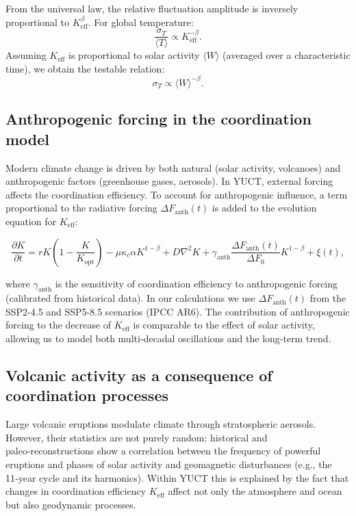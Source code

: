 \documentclass[12pt,a4paper]{article}
\newcommand{\Keff}{K_{\mathrm{eff}}}
\newcommand{\be}{\beta}
\begin{document}
	From the universal law, the relative fluctuation amplitude is inversely proportional to \(\Keff^{\be}\). For global temperature:
	\[
	\frac{\sigma_T}{\langle T \rangle} \propto \Keff^{-\be}.
	\]
	Assuming \(\Keff\) is proportional to solar activity \(\langle W \rangle\) (averaged over a characteristic time), we obtain the testable relation:
	\[
	\sigma_T \propto \langle W \rangle^{-\be}.
	\]
	
	\subsection{Anthropogenic forcing in the coordination model}
	
	Modern climate change is driven by both natural (solar activity, volcanoes) and anthropogenic factors (greenhouse gases, aerosols). In YUCT, external forcing affects the coordination efficiency. To account for anthropogenic influence, a term proportional to the radiative forcing \(\Delta F_{\mathrm{anth}}(t)\) is added to the evolution equation for \(K_{\mathrm{eff}}\):
	
	\[
	\frac{\partial K}{\partial t} = r K \left(1 - \frac{K}{K_{\mathrm{opt}}}\right) - \mu \kappa_c \alpha K^{1-\beta} 
	+ D\nabla^2 K + \gamma_{\mathrm{anth}} \frac{\Delta F_{\mathrm{anth}}(t)}{\Delta F_0} K^{1-\beta} + \xi(t),
	\]
	
	where \(\gamma_{\mathrm{anth}}\) is the sensitivity of coordination efficiency to anthropogenic forcing (calibrated from historical data). In our calculations we use \(\Delta F_{\mathrm{anth}}(t)\) from the SSP2-4.5 and SSP5-8.5 scenarios (IPCC AR6). The contribution of anthropogenic forcing to the decrease of \(K_{\mathrm{eff}}\) is comparable to the effect of solar activity, allowing us to model both multi‑decadal oscillations and the long‑term trend.
	
	\subsection{Volcanic activity as a consequence of coordination processes}
	
	Large volcanic eruptions modulate climate through stratospheric aerosols. However, their statistics are not purely random: historical and paleo‑reconstructions show a correlation between the frequency of powerful eruptions and phases of solar activity and geomagnetic disturbances (e.g., the 11‑year cycle and its harmonics). Within YUCT this is explained by the fact that changes in coordination efficiency \(\Keff\) affect not only the atmosphere and ocean but also geodynamic processes.
	
\end{document}
